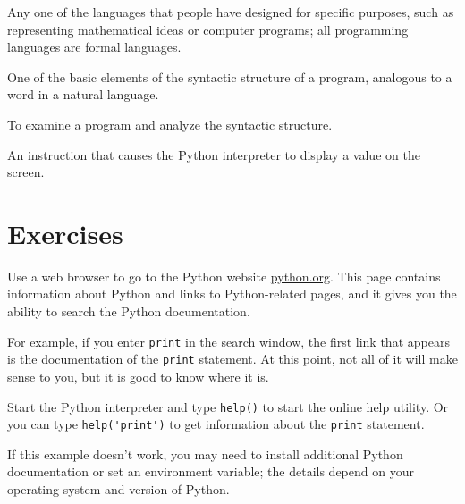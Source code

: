 \begin{vocabulary}  Any one of the languages that people have designed
	for specific purposes, such as representing mathematical ideas or
	computer programs; all programming languages are formal languages.
\end{vocabulary}
	
\begin{vocabulary}[token:]  One of the basic elements of the syntactic structure of
	a program, analogous to a word in a natural language.
\end{vocabulary}
	
\begin{vocabulary}[parse:]  To examine a program and analyze the syntactic structure.
\end{vocabulary}
	
\begin{vocabulary}  An instruction that causes the Python
	interpreter to display a value on the screen.
\end{vocabulary}


\section{Exercises}

\begin{exercise}
	Use a web browser to go to the Python website \url{python.org}.
	This page contains information about Python and links
	to Python-related pages, and it gives you the ability to search
	the Python documentation.
	
	For example, if you enter {\tt print} in the search window, the
	first link that appears is the documentation of the {\tt print}
	statement.  At this point, not all of it will make sense to you,
	but it is good to know where it is.
	
\end{exercise}

\begin{exercise}
	Start the Python interpreter and type {\tt help()} to start the online
	help utility.  Or you can type \verb"help('print')" to get information
	about the {\tt print} statement.
	
	If this example doesn't work, you
	may need to install additional Python documentation or set an
	environment variable; the details depend on your operating system and
	version of Python.
\end{exercise}

